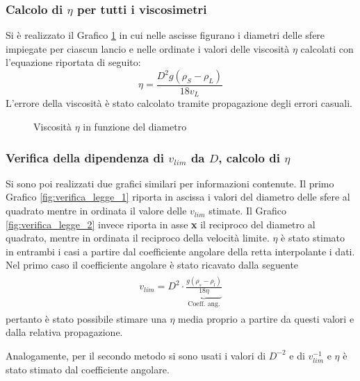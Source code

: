 \documentclass[a4paper,11pt,oneside]{article}
\begin{document}
\subsubsection*{Calcolo di $\eta$ per tutti i viscosimetri}
Si è realizzato il Grafico \ref{fig:eta} in cui nelle ascisse figurano i diametri delle sfere impiegate per ciascun lancio e nelle ordinate i valori delle viscosità $\eta$ calcolati con l'equazione riportata di seguito:
\begin{equation*}
    \eta= \frac{{D}^2g\left(\rho_S - \rho_L\right)}{18 v_{L}} 
\end{equation*}
L'errore della viscosità è stato calcolato tramite propagazione degli errori casuali.

\vspace{0.5cm}
\begin{figure}[h!]
    \centering
    \caption{Viscosità $\eta$ in funzione del diametro}
    \label{fig:eta}
\end{figure}


\subsubsection*{Verifica della dipendenza di $v_{lim}$ da $D$, calcolo di $\eta$}
Si sono poi realizzati due grafici similari per informazioni contenute. Il primo Grafico \ref{fig:verifica_legge_1} riporta in ascissa i valori del diametro delle sfere al quadrato mentre in ordinata il valore delle $v_{lim}$ stimate. Il Grafico \ref{fig:verifica_legge_2} invece riporta in asse \textbf{x} il reciproco del diametro al quadrato, mentre in ordinata il reciproco della velocità limite. $\eta$ è stato stimato in entrambi i casi a partire dal coefficiente angolare della retta interpolante i dati.\newline
Nel primo caso il coefficiente angolare è stato ricavato dalla seguente
\begin{align*}
\begin{split}
    v_{lim}=D^{2} \cdot \underbrace{\frac{g (\rho_s - \rho_l)}{18 \eta}}_\text{Coeff. ang.}
\end{split}
\end{align*}
pertanto è stato possibile stimare una $\eta$ media proprio a partire da questi valori e dalla relativa propagazione.

Analogamente, per il secondo metodo si sono usati i valori di $D^{-2}$ e di $v_{lim}^{-1}$ e $\eta$ è stato stimato dal coefficiente angolare.
\end{document}
